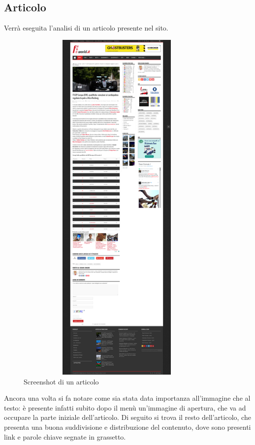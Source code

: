 \subsection{Articolo}
Verr\`a eseguita l'analisi di un articolo presente nel sito.

\begin{figure}[h] %
  \centering
  \includegraphics[height=18cm, width=10cm]{res/img/Article}
  \caption{Screenshot di un articolo}
\end{figure}

Ancora una volta si fa notare come sia stata data importanza all'immagine che al
testo: è presente infatti subito dopo il menù un'immagine di apertura, che va
ad occupare la parte iniziale dell'articolo.
Di seguito si trova il resto dell'articolo, che presenta una buona suddivisione
e distribuzione del contenuto, dove sono presenti link e parole chiave segnate
in grassetto.

